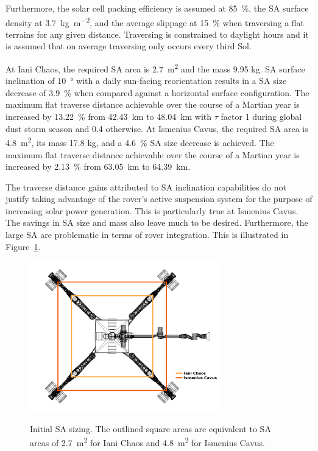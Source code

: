 \documentclass[twocolumn,letterpaper]{IEEEAerospaceCLS}  %
\newcommand{\refFig}[1]{{Figure}~\ref{#1}} %
\begin{document}
Furthermore, the solar cell packing efficiency is assumed at \SI{85}{\percent}, the \ac{SA} surface density at \SI{3.7}{kg.m^{-2}}, and the average slippage at \SI{15}{\percent} when traversing a flat terrains for any given distance. Traversing is constrained to daylight hours and it is assumed that on average traversing only occurs every third Sol.

At Iani Chaos, the required \ac{SA} area is \SI{2.7}{m^{2}} and the mass 9.95 \si{\kilo\gram}. \ac{SA} surface inclination of \SI{10}{\degree} with a daily sun-facing reorientation results in a \ac{SA} size decrease of \SI{3.9}{\percent} when compared against a horizontal surface configuration. The maximum flat traverse distance achievable over the course of a Martian year is increased by \SI{13.22}{\percent} from \SI{42.43}{\kilo\meter} to \SI{48.04}{\kilo\meter} with $\tau$ factor 1 during global dust storm season and 0.4 otherwise. At Ismenius Cavus, the required \ac{SA} area is \SI{4.8}{m^{2}}, its mass 17.8 \si{\kilo\gram}, and a \SI{4.6}{\percent} \ac{SA} size decrease is achieved. The maximum flat traverse distance achievable over the course of a Martian year is increased by \SI{2.13}{\percent} from \SI{63.05}{\kilo\meter} to \SI{64.39}{\kilo\meter}.

The traverse distance gains attributed to \ac{SA} inclination capabilities do not justify taking advantage of the rover's active suspension system for the purpose of increasing solar power generation. This is particularly true at Ismenius Cavus. The savings in \ac{SA} size and mass also leave much to be desired. Furthermore, the large \ac{SA} are problematic in terms of rover integration. This is illustrated in \refFig{fig:sa-area-initial-sizes}.

\begin{figure}[h]
  \centering
  \includegraphics[width=3.25in]{figures/images/sa-area-initial-sizes.png}\\
  \caption{Initial \ac{SA} sizing. The outlined square areas are equivalent to \ac{SA} areas of \SI{2.7}{m^{2}} for Iani Chaos and \SI{4.8}{m^{2}} for Ismenius Cavus.}
  \label{fig:sa-area-initial-sizes}
\end{figure}
\end{document}
